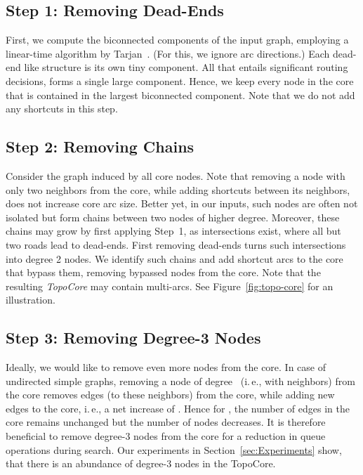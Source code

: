 \documentclass{sig-alternate}
\newcommand{\ie}{i.\,e.\xspace}
\begin{document}
\subsection{Step 1: Removing Dead-Ends}
First, we compute the biconnected components of the input graph, employing a linear-time algorithm by Tarjan~\cite{t-dfslg2-72}. (For this, we ignore arc directions.)
Each dead-end like structure is its own tiny component. 
All that entails significant routing decisions, forms a single large component.
Hence, we keep every node in the core that is contained in the largest biconnected component.
Note that we do not add any shortcuts in this step. 



\subsection{Step 2: Removing Chains}

Consider the graph induced by all core nodes. 
Note that removing a node with only two neighbors from the core, while adding shortcuts between its neighbors, does not increase core arc size.
Better yet, in our inputs, such nodes are often not isolated but form chains between two nodes of higher degree. 
Moreover, these chains may grow by first applying Step~1, as intersections exist, where all but two roads lead to dead-ends. 
First removing dead-ends turns such intersections into degree 2 nodes.
We identify such chains and add shortcut arcs to the core that bypass them, removing bypassed nodes from the core.
Note that the resulting \emph{TopoCore} may contain multi-arcs. See Figure~\ref{fig:topo-core} for an illustration. 


\subsection{Step 3: Removing Degree-3 Nodes}
Ideally, we would like to remove even more nodes from the core.
In case of undirected simple graphs, removing a node of degree~ (\ie, with  neighbors) from the core removes  edges (to these neighbors) from the core, while adding  new edges to the core, \ie, a net increase of . Hence for , the number of edges in the core remains unchanged but the number of
nodes decreases. It is therefore beneficial to remove degree-3 nodes
from the core for a reduction in queue operations during search. Our experiments in Section~\ref{sec:Experiments} show, that there is an abundance of degree-3 nodes in the TopoCore.
\end{document}
